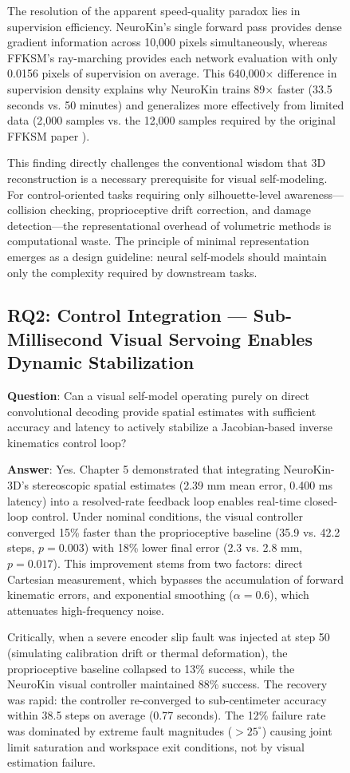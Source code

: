 \documentclass[12pt,a4paper,oneside]{report}
\begin{document}
\begin{figure}[H]
The resolution of the apparent speed-quality paradox lies in supervision efficiency. NeuroKin's single forward pass provides dense gradient information across 10,000 pixels simultaneously, whereas FFKSM's ray-marching provides each network evaluation with only 0.0156 pixels of supervision on average. This 640,000$\times$ difference in supervision density explains why NeuroKin trains 89$\times$ faster (33.5 seconds vs. 50 minutes) and generalizes more effectively from limited data (2,000 samples vs. the 12,000 samples required by the original FFKSM paper \cite{hu2024teaching}).

This finding directly challenges the conventional wisdom that 3D reconstruction is a necessary prerequisite for visual self-modeling. For control-oriented tasks requiring only silhouette-level awareness---collision checking, proprioceptive drift correction, and damage detection---the representational overhead of volumetric methods is computational waste. The principle of minimal representation emerges as a design guideline: neural self-models should maintain only the complexity required by downstream tasks.

\subsection{RQ2: Control Integration --- Sub-Millisecond Visual Servoing Enables Dynamic Stabilization}

\textbf{Question}: Can a visual self-model operating purely on direct convolutional decoding provide spatial estimates with sufficient accuracy and latency to actively stabilize a Jacobian-based inverse kinematics control loop?

\textbf{Answer}: Yes. Chapter 5 demonstrated that integrating NeuroKin-3D's stereoscopic spatial estimates (2.39 mm mean error, 0.400 ms latency) into a resolved-rate feedback loop enables real-time closed-loop control. Under nominal conditions, the visual controller converged 15\% faster than the proprioceptive baseline (35.9 vs. 42.2 steps, $p = 0.003$) with 18\% lower final error (2.3 vs. 2.8 mm, $p = 0.017$). This improvement stems from two factors: direct Cartesian measurement, which bypasses the accumulation of forward kinematic errors, and exponential smoothing ($\alpha = 0.6$), which attenuates high-frequency noise.

Critically, when a severe encoder slip fault was injected at step 50 (simulating calibration drift or thermal deformation), the proprioceptive baseline collapsed to 13\% success, while the NeuroKin visual controller maintained 88\% success. The recovery was rapid: the controller re-converged to sub-centimeter accuracy within 38.5 steps on average (0.77 seconds). The 12\% failure rate was dominated by extreme fault magnitudes ($>25^\circ$) causing joint limit saturation and workspace exit conditions, not by visual estimation failure.


\end{figure}
\end{document}
